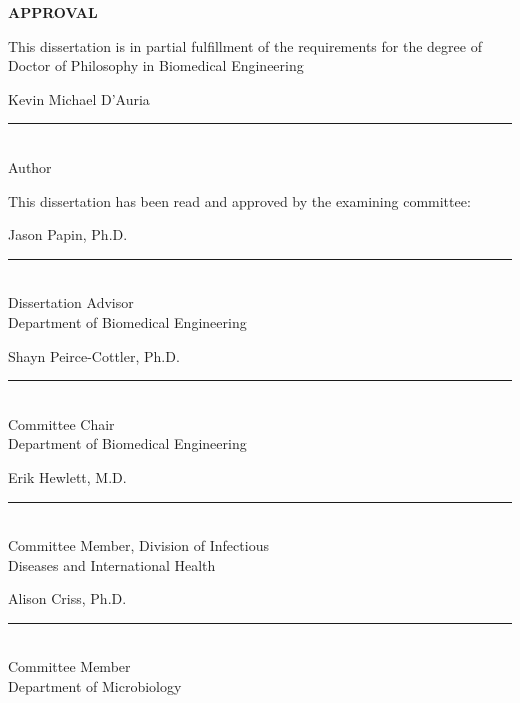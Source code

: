 \begin{center}

\LARGE{ \textbf{APPROVAL} }

\vspace{0.3in}
\normalsize This dissertation is in partial fulfillment of the requirements for the degree of
Doctor of Philosophy in Biomedical Engineering

\vspace{0.2in}

\begin{flushright}
\Large{ Kevin Michael D'Auria } \\[-0.11in]
\rule{0.5\textwidth}{0.5pt} \\
\normalsize{Author} \\[-0.02in]
\end{flushright}

\vspace{0.3in}

This dissertation has been read and approved by the examining committee:

\vspace{0.2in}

\begin{flushright}
\Large{ Jason Papin, Ph.D. } \\[-0.11in]
\rule{0.5\textwidth}{0.5pt} \\[-0.02in]
\normalsize{Dissertation Advisor \\ Department of Biomedical Engineering }
\end{flushright} 

\begin{flushright}
\Large{ Shayn Peirce-Cottler, Ph.D. } \\[-0.11in]
\rule{0.5\textwidth}{0.5pt} \\[-0.02in]
\normalsize{Committee Chair \\ Department of Biomedical Engineering}
\end{flushright}

\begin{flushright}
\Large{ Erik Hewlett, M.D. } \\[-0.11in]
\rule{0.5\textwidth}{0.5pt} \\[-0.02in]
\normalsize{Committee Member, Division of Infectious \\ Diseases and International Health}
\end{flushright}

\begin{flushright}
\Large{ Alison Criss, Ph.D. } \\[-0.11in]
\rule{0.5\textwidth}{0.5pt} \\[-0.02in]
\normalsize{Committee Member \\ Department of Microbiology}
\end{flushright}


\end{center}
